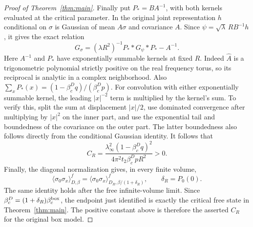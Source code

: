 \documentclass[11pt]{article}
\begin{document}
\begin{proof}[Proof of Theorem~\ref{thm:main}]
Finally put \(P_*=BA^{-1}\), with both kernels evaluated at the
critical parameter. In the original joint representation
\(h\) conditional on \(\sigma\) is Gaussian of mean \(A\sigma\)
and covariance \(A\). Since \(\psi=\sqrt\lambda\,R B^{-1}h\),
it gives the exact relation
\[
 G_\sigma=(\lambda R^2)^{-1}P_* * G_\psi *P_* - A^{-1}.
\]
Here \(A^{-1}\) and \(P_*\) have exponentially summable kernels
at fixed \(R\). Indeed \(\widehat A\) is a trigonometric polynomial
strictly positive on the real frequency torus, so its reciprocal
is analytic in a complex neighborhood. Also
\(\sum_xP_*(x)=(1-\beta_c^D q)/(\beta_c^D p)\).
For convolution with either exponentially summable kernel,
the leading \(|x|^{-2}\) term is multiplied by the kernel's
sum. To verify this, split the sum at displacement \(|x|/2\),
use dominated convergence after multiplying by \(|x|^2\) on the
inner part, and use the exponential tail and boundedness of
the covariance on the outer part. The latter boundedness
also follows directly from the conditional Gaussian identity.
It follows that
\[
 C_R=\frac{\lambda_\infty^2(1-\beta_c^D q)^2}
             {4\pi^2 t_2\beta_c^D p R^2}>0 .
\]
Finally, the diagonal normalization gives, in every finite volume,
\[
 \langle\sigma_0\sigma_x\rangle^f_{D,\beta}
 =\langle\sigma_0\sigma_x\rangle^f_{D_R,\beta/(1+\delta_R)},
 \qquad \delta_R=P_0(0).
\]
The same identity holds after the free infinite-volume limit.
Since \(\beta_c^D=(1+\delta_R)\beta_c^{\rm box}\), the endpoint
just identified is exactly the critical free state in
Theorem~\ref{thm:main}. The positive constant above is therefore
the asserted \(C_R\) for the original box model.
\end{proof}
\end{document}

